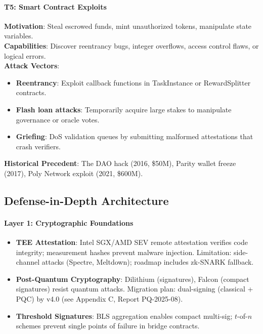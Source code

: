\documentclass[11pt]{article}
\begin{document}
\paragraph{T5: Smart Contract Exploits}
\textbf{Motivation}: Steal escrowed funds, mint unauthorized tokens, manipulate state variables.\\
\textbf{Capabilities}: Discover reentrancy bugs, integer overflows, access control flaws, or logical errors.\\
\textbf{Attack Vectors}:
\begin{itemize}[noitemsep]
  \item \textbf{Reentrancy}: Exploit callback functions in TaskInstance or RewardSplitter contracts.
  \item \textbf{Flash loan attacks}: Temporarily acquire large stakes to manipulate governance or oracle votes.
  \item \textbf{Griefing}: DoS validation queues by submitting malformed attestations that crash verifiers.
\end{itemize}
\textbf{Historical Precedent}: The DAO hack (2016, \$50M), Parity wallet freeze (2017), Poly Network exploit (2021, \$600M).

\subsection{Defense-in-Depth Architecture}

\paragraph{Layer 1: Cryptographic Foundations}
\begin{itemize}[noitemsep]
  \item \textbf{TEE Attestation}: Intel SGX/AMD SEV remote attestation verifies code integrity; measurement hashes prevent malware injection. Limitation: side-channel attacks (Spectre, Meltdown); roadmap includes zk-SNARK fallback.
  \item \textbf{Post-Quantum Cryptography}: Dilithium (signatures), Falcon (compact signatures) resist quantum attacks. Migration plan: dual-signing (classical + PQC) by v4.0 (see Appendix C, Report PQ-2025-08).
  \item \textbf{Threshold Signatures}: BLS aggregation enables compact multi-sig; $t$-of-$n$ schemes prevent single points of failure in bridge contracts.
\end{itemize}
\end{document}
